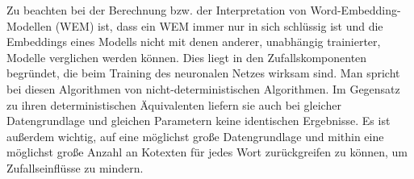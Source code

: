 \hspace{-1mm} Zu beachten bei der Berechnung bzw. der Interpretation von Word-Embedding-Modellen (WEM) ist, dass ein WEM immer nur in sich schlüssig ist und die Embeddings eines Modells nicht mit denen anderer, unabhängig trainierter, Modelle verglichen werden können. Dies liegt in den Zufallskomponenten begründet, die beim Training des neuronalen Netzes wirksam sind. Man spricht bei diesen Algorithmen von nicht-deterministischen Algorithmen. Im Gegensatz zu ihren deterministischen Äquivalenten liefern sie auch bei gleicher Datengrundlage und gleichen Parametern keine identischen Ergebnisse. Es ist außerdem wichtig, auf eine möglichst große Datengrundlage und mithin eine möglichst große Anzahl an Kotexten für jedes Wort zurückgreifen zu können, um Zufallseinflüsse zu mindern.

\label{vergleichbarkeit-von-word-embedding-modellen}

